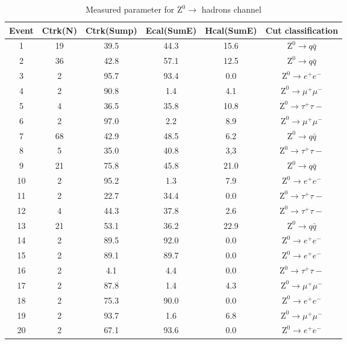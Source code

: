\begin{table*}[htbp]
	\centering
	
	\begin{tabular}{ccc ccc}
		\toprule
		Event & Ctrk(N) & Ctrk(Sump) & Ecal(SumE) & Hcal(SumE) & Cut classification \\
		\midrule

1& 19& 39.5&44.3&15.6 & $ \text{Z}^0\rightarrow q\bar{q}$\\
2& 36& 42.8&57.1&12.5& $ \text{Z}^0\rightarrow q \bar{q}$\\
3& 2& 95.7& 93.4&0.0& $ \text{Z}^0\rightarrow e^+e^- $\\
4& 2& 90.8&1.4&4.1& $ \text{Z}^0\rightarrow \mu^+\mu^- $\\
5& 4& 36.5&35.8&10.8& $ \text{Z}^0\rightarrow \tau^+\tau-$\\
6& 2& 97.0&2.2&8.9& $ \text{Z}^0\rightarrow \mu^+\mu^- $\\
7& 68& 42.9&48.5&6.2& $ \text{Z}^0\rightarrow q\bar{q}$\\
8& 5& 35.0&40.8&3,3& $ \text{Z}^0\rightarrow \tau^+\tau-$\\
9& 21& 75.8&45.8&21.0&$ \text{Z}^0\rightarrow q \bar{q}$\\
10& 2& 95.2&1.3&7.9& $ \text{Z}^0\rightarrow e^+e^- $\\
11& 2& 22.7&34.4&0.0& $ \text{Z}^0\rightarrow \tau^+\tau-$\\
12& 4& 44.3&37.8&2.6& $ \text{Z}^0\rightarrow \tau^+\tau-$\\
13& 21& 53.1&36.2&22.9& $ \text{Z}^0\rightarrow q\bar{q}$\\
14& 2& 89.5&92.0&0.0& $ \text{Z}^0\rightarrow e^+e^- $\\
15& 2& 89.1&89.7&0.0& $ \text{Z}^0\rightarrow e^+e^- $\\
16& 2& 4.1&4.4&0.0& $ \text{Z}^0\rightarrow \tau^+\tau-$\\
17& 2& 87.8&1.4&4.3& $ \text{Z}^0\rightarrow \mu^+\mu^- $\\
18& 2& 75.3&90.0&0.0& $ \text{Z}^0\rightarrow e^+e^- $\\
19& 2& 93.7&1.6&6.8& $ \text{Z}^0\rightarrow \mu^+\mu^- $\\
20& 2& 67.1&93.6&0.0& $ \text{Z}^0\rightarrow e^+e^- $\\
\bottomrule
\end{tabular}
\caption{Measured parameter for $ \text{Z}^0\rightarrow $ hadrons channel}
\label{tab:test1}
\end{table*}
